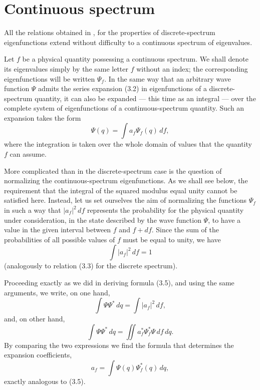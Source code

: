 \section{Continuous spectrum}

All the relations obtained in ,  for the properties of discrete-spectrum
eigenfunctions extend without difficulty to a continuous spectrum of
eigenvalues.

Let $f$ be a physical quantity possessing a continuous spectrum. We shall
denote its eigenvalues simply by the same letter $f$ without an index; the
corresponding eigenfunctions will be written $\Psi_f$. In the same way that an
arbitrary wave function $\Psi$ admits the series expansion (3.2) in
eigenfunctions of a discrete-spectrum quantity, it can also be expanded --- this
time as an integral --- over the complete system of eigenfunctions of a
continuous-spectrum quantity. Such an expansion takes the form
\begin{equation}
  \Psi(q)=\int a_f\Psi_f(q)\,df,
  \tag{5.1}
\end{equation}
where the integration is taken over the whole domain of values that the
quantity $f$ can assume.

More complicated than in the discrete-spectrum case is the question of
normalizing the continuous-spectrum eigenfunctions. As we shall see below, the
requirement that the integral of the squared modulus equal unity cannot be
satisfied here. Instead, let us set ourselves
the aim of normalizing the functions $\Psi_f$ in such a way that $|a_f|^2\,df$
represents the probability for the physical quantity under consideration, in
the state described by the wave function $\Psi$, to have a value in the given
interval between $f$ and $f+df$.
Since the sum of the probabilities of all possible
values of $f$ must be equal to unity, we have
\begin{equation}
  \int |a_f|^2\,df=1
  \tag{5.2}
\end{equation}
(analogously to relation (3.3) for the discrete spectrum).

Proceeding exactly as we did in deriving formula (3.5), and using the same
arguments, we write, on one hand,
\[
  \int\Psi\Psi^*\,dq=\int|a_f|^2\,df,
\]
and, on other hand,
\[
  \int\Psi\Psi^*\,dq
  =\iint a_f^*\Psi_f^*\Psi\,df\,dq.
\]
By comparing the two expressions we find the formula that determines the
expansion coefficients,
\begin{equation}
  a_f=\int\Psi(q)\Psi_f^*(q)\,dq,
  \tag{5.3}
\end{equation}
exactly analogous to (3.5).

